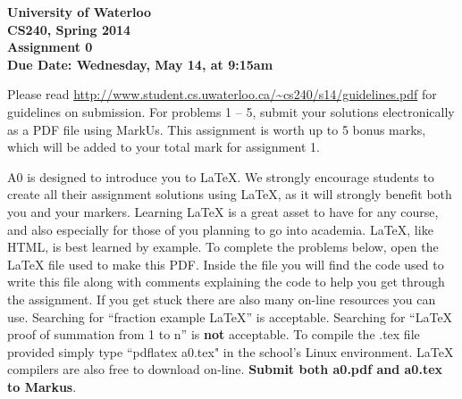 \documentclass[12pt]{article}
\begin{document}
\begin{center}
{\Large\bf University of Waterloo}\\
\vspace{3mm}
{\Large\bf CS240, Spring 2014}\\
\vspace{2mm}
{\Large\bf Assignment 0}\\
\vspace{3mm}
\textbf{Due Date: Wednesday, May 14, at 9:15am}
\end{center}

\def\question#1{\item[\bf #1.]}
\def\part#1{\item[\bf #1)]}
\newcommand{\pc}[1]{\mbox{\textbf{#1}}} %

Please read
\url{http://www.student.cs.uwaterloo.ca/~cs240/s14/guidelines.pdf}
for guidelines on submission.  For problems 1 -- 5, submit your
solutions electronically as a PDF file using MarkUs.
This assignment is worth up to 5 bonus marks, which will be added to
your total mark for assignment 1.


A0 is designed to introduce you to \LaTeX{}.
We strongly encourage students to create all their assignment solutions using \LaTeX{},
as it will strongly benefit both you and your markers. Learning \LaTeX{} is a great asset 
to have for any course, and also especially for those of you planning to go into academia.
\LaTeX{}, like HTML, is best learned by example. To complete the problems below, open the 
\LaTeX{} file used to make this PDF. Inside the file you will find the code used to write this
file along with comments explaining the code to help you get through the assignment. If you get
stuck there are also many on-line resources you can use. Searching for ``fraction example \LaTeX{}'' 
is acceptable. Searching for ``\LaTeX{} proof of summation from 1 to n'' 
is {\bf not} acceptable. To compile the .tex file provided simply type ``pdflatex a0.tex" 
in the school's Linux environment. \LaTeX{}  compilers are also free to download on-line.
{\bf Submit both a0.pdf and a0.tex to Markus}.
\end{document}
